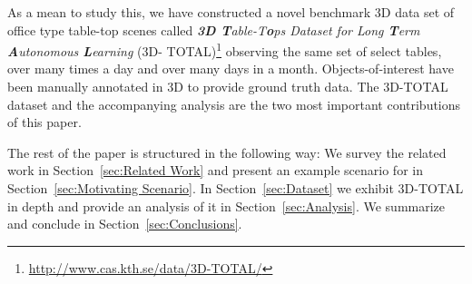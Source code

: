 \documentclass[letterpaper, 10 pt, conference]{ieeeconf}  %
\begin{document}
As a mean to study this, we have constructed a novel benchmark 3D data set of office type 
table-top scenes called \textit{\textbf{3D T}able-T\textbf{o}ps Dataset for Long \textbf{T}erm \textbf{A}utonomous \textbf{L}earning} (3D-
TOTAL)\footnote{\url{http://www.cas.kth.se/data/3D-TOTAL/}} observing the same set of select tables, over many times a day and over many 
days in a month. Objects-of-interest have been manually annotated in 3D to provide ground truth data. The 3D-TOTAL dataset and the 
accompanying analysis are the two most important contributions of this paper.

The rest of the paper is structured in the following way: We survey the related work in Section~\ref{sec:Related Work} and present an 
example scenario for in Section~\ref{sec:Motivating Scenario}. In Section~\ref{sec:Dataset} we exhibit 3D-TOTAL in 
depth and provide an analysis of it in Section~\ref{sec:Analysis}. We summarize and conclude in Section~\ref{sec:Conclusions}.


\end{document}

